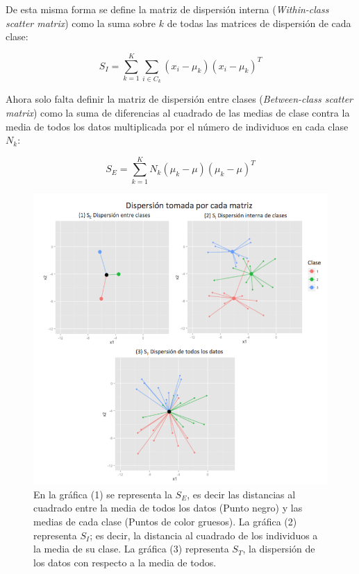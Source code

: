 De esta misma forma se define la matriz de dispersión interna (\textit{Within-class scatter matrix}) como la suma sobre $k$ de todas las matrices de dispersión de cada clase:

\begin{equation}\label{eq:2.3}
S_I = \sum_{k=1}^{K} 
					\sum_{i \in C_k}
 ({x_i-\mu_{k}})({x_i-\mu_{k}})^T 	
\end{equation}

Ahora solo falta definir la matriz de dispersión entre clases (\textit{Between-class scatter matrix}) como la suma de diferencias al cuadrado de las medias de clase contra la media de todos los datos multiplicada por el número de individuos en cada clase $N_k$:

\begin{equation} \label{eq:2.4}
S_E = \sum_{k = 1}^K N_k (\mu_k - \mu)(\mu_k - \mu)^T	
\end{equation}

\begin{figure}[!ht] \label{Fig1.1}
  \centering
	\includegraphics[width=1\textwidth]{Figures/Chapter2_SE_SI}	
  \caption[Distancias en las matrices de dispersión.]
  {En la gráfica (1) se representa la $S_E$, es decir las distancias al cuadrado entre la media de todos los datos (Punto negro) y las medias de cada clase (Puntos de color gruesos). La gráfica (2) representa $S_I$; es decir, la distancia al cuadrado de los individuos a la media de su clase. La gráfica (3) representa $S_T$, la dispersión de los datos con respecto a la media de todos.}
\end{figure}

